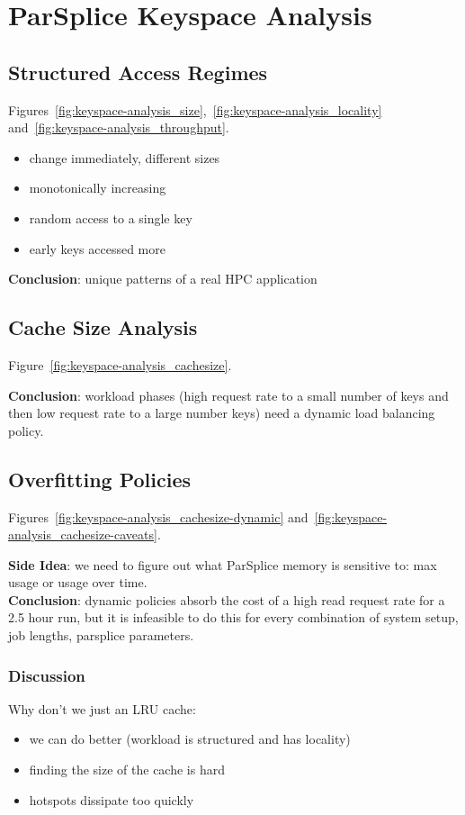 \section{ParSplice Keyspace Analysis}

\subsection{Structured Access Regimes}

Figures~\ref{fig:keyspace-analysis_size},~\ref{fig:keyspace-analysis_locality} and~\ref{fig:keyspace-analysis_throughput}.
\begin{itemize}
  \item change immediately, different sizes
  \item monotonically increasing
  \item random access to a single key
  \item early keys accessed more
\end{itemize}

\noindent\textbf{Conclusion}: unique patterns of a real HPC application

\subsection{Cache Size Analysis}

Figure~\ref{fig:keyspace-analysis_cachesize}.

\noindent\textbf{Conclusion}: workload phases (high request rate to a small
number of keys and then low request rate to a large number keys) need a dynamic
load balancing policy.

\subsection{Overfitting Policies}

Figures~\ref{fig:keyspace-analysis_cachesize-dynamic} and~\ref{fig:keyspace-analysis_cachesize-caveats}.

\noindent\textbf{Side Idea}: we need to figure out what ParSplice memory is
sensitive to: max usage or usage over time.\\

\noindent\textbf{Conclusion}: dynamic policies absorb the cost of a high read
request rate for a 2.5 hour run, but it is infeasible to do this for every
combination of system setup, job lengths, parsplice parameters.

\subsubsection*{Discussion}
Why don't we just an LRU cache:
\begin{itemize}
  \item we can do better (workload is structured and has locality)
  \item finding the size of the cache is hard
  \item hotspots dissipate too quickly
\end{itemize}
